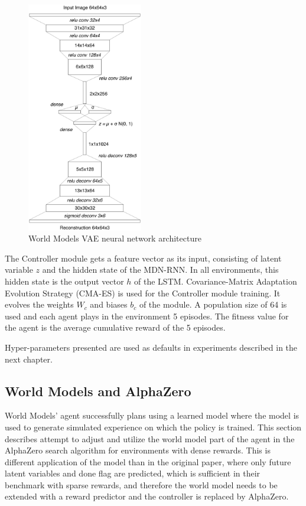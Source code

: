 \begin{figure}[H]
\includegraphics[width=0.45\textwidth,keepaspectratio]{figures/WorldModels/world_models_vae_architecture.png}
\caption{World Models VAE neural network architecture \cite{Algo.WorldModels}}
\label{Fig.WorldModelsVAEArchitecture}
\end{figure}

The Controller module gets a feature vector as its input, consisting of latent variable $z$ and the hidden state of the MDN-RNN. In all environments, this hidden state is the output vector $h$ of the LSTM. Covariance-Matrix Adaptation Evolution Strategy (CMA-ES) \cite{Algo.CMAES} is used for the Controller module training. It evolves the weights $W_c$ and biases $b_c$ of the module. A population size of 64 is used and each agent plays in the environment 5 episodes. The fitness value for the agent is the average cumulative reward of the 5 episodes.

Hyper-parameters presented are used as defaults in experiments described in the next chapter.

\subsection{World Models and AlphaZero}

World Models' agent \cite{Algo.WorldModels} successfully plans using a learned model where the model is used to generate simulated experience on which the policy is trained. This section describes attempt to adjust and utilize the world model part of the agent in the AlphaZero \cite{Algo.AlphaZero} search algorithm for environments with dense rewards. This is different application of the model than in the original paper, where only future latent variables and done flag are predicted, which is sufficient in their benchmark with sparse rewards, and therefore the world model needs to be extended with a reward predictor and the controller is replaced by AlphaZero.

